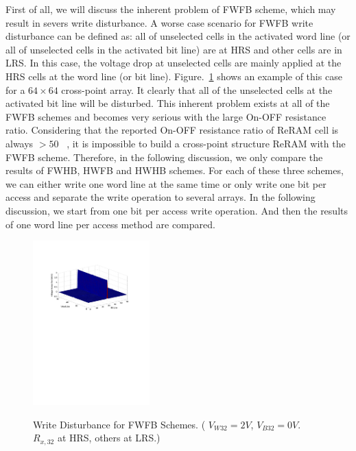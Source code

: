 First of all, we will discuss the inherent problem of FWFB scheme, which
may result in severs write disturbance. A worse case scenario for FWFB
write disturbance can be defined as: all of unselected cells in the
activated word line (or all of unselected cells in the activated bit line)
are at HRS and other cells are in LRS. In this case, the voltage drop at
unselected cells are mainly applied at the HRS cells at the word line (or
bit line). Figure.~\ref{fig:FWFR} shows an example of this case for a $64
\times 64$ cross-point array. It clearly that all of the unselected cells
at the activated bit line will be disturbed. This inherent problem exists
at all of the FWFB schemes and becomes very serious with the large On-OFF
resistance ratio. Considering that the reported On-OFF resistance ratio of
ReRAM cell is always $>50$
~\cite{ReRAM_IEDM2010_Ho,ReRAM_IEDM2010_Chien,ReRAM_IEDM2010_Lee_Diode,ReRAM_IEDM2010_Lee_Evidence,ReRAM_ISSCC2011_Sheu,ReRAM_ISSCC2011_Otsuka},
it is impossible to build a cross-point structure ReRAM with the FWFB
scheme. Therefore, in the following discussion, we only compare the
results of FWHB, HWFB and HWHB schemes. For each of these three schemes,
we can either write one word line at the same time or only write one bit
per access and separate the write operation to several arrays. In the
following discussion, we start from one bit per access write operation.
And then the results of one word line per access method are compared.

\begin{figure}%
\centering
  \includegraphics[width=0.4\textwidth]{./figures/FWFB2.pdf}\\
  \caption{Write Disturbance for FWFB Schemes. ( $V_{W32} = 2V$, $V_{B32} = 0V$. $R_{x,32}$ at HRS, others at LRS.) }\label{fig:FWFR}
\end{figure}

